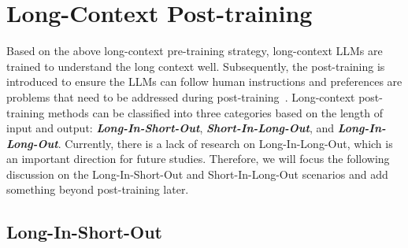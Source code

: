 \section{Long-Context Post-training}\label{sec9}

Based on the above long-context pre-training strategy, long-context LLMs are trained to understand the long context well. Subsequently, the post-training is introduced to ensure the LLMs can follow human instructions and preferences are problems that need to be addressed during post-training~\citep{dubey2024llama, bai2024longalign}. Long-context post-training methods can be classified into three categories based on the length of input and output: \textbf{\textit{Long-In-Short-Out}}, \textbf{\textit{Short-In-Long-Out}}, and \textbf{\textit{Long-In-Long-Out}}. Currently, there is a lack of research on Long-In-Long-Out, which is an important direction for future studies. Therefore, we will focus the following discussion on the Long-In-Short-Out and Short-In-Long-Out scenarios and add something beyond post-training later.

\subsection{Long-In-Short-Out}

